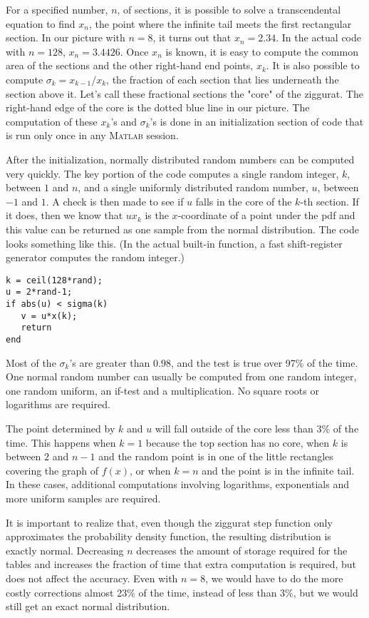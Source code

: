 \documentclass[a4paper,twocolumn,11pt]{article}
\newcommand{\Matlab}{{\textsc{Matlab}}}
\begin{document}
For a specified number, $n$, of sections, it is possible to solve a
transcendental equation to find $x_n$, the point where the infinite
tail meets the first rectangular section. In our picture with $n = 8$,
it turns out that $x_n = 2.34$. In the actual code with $n = 128$,
$x_n= 3.4426$. Once $x_n$ is known, it is easy to compute the common
area of the sections and the other right-hand end points, $x_k$. It is
also possible to compute $\sigma_k=x_{k-1}/x_{k}$, the fraction of
each section that lies underneath the section above it. Let's call
these fractional sections the "core" of the ziggurat. The right-hand
edge of the core is the dotted blue line in our picture. The
computation of these $x_k$'s and $\sigma_k$'s is done in an
initialization section of code that is run only once in any
{{\Matlab}} session.

After the initialization, normally distributed random numbers can be
computed very quickly. The key portion of the code computes a single
random integer, $k$, between $1$ and $n$, and a single uniformly
distributed random number, $u$, between $-1$ and $1$. A check is then
made to see if $u$ falls in the core of the $k$-th section. If it
does, then we know that $ux_k$ is the $x$-coordinate of a point under
the pdf and this value can be returned as one sample from the normal
distribution. The code looks something like this. (In the actual
built-in function, a fast shift-register generator computes the random
integer.)
\begin{verbatim}k = ceil(128*rand);
u = 2*rand-1;
if abs(u) < sigma(k)
   v = u*x(k);
   return
end
\end{verbatim}

Most of the $\sigma_k$'s are greater than $0.98$, and the test is true
over 97\% of the time. One normal random number can usually be
computed from one random integer, one random uniform, an if-test and a
multiplication. No square roots or logarithms are required.

The point determined by $k$ and $u$ will fall outside of the core less
than 3\% of the time. This happens when $k= 1$ because the top section
has no core, when $k$ is between $2$ and $n-1$ and the random point is
in one of the little rectangles covering the graph of $f(x)$, or when
$k = n$ and the point is in the infinite tail. In these cases,
additional computations involving logarithms, exponentials and more
uniform samples are required.

It is important to realize that, even though the ziggurat step
function only approximates the probability density function, the
resulting distribution is exactly normal. Decreasing $n$ decreases the
amount of storage required for the tables and increases the fraction
of time that extra computation is required, but does not affect the
accuracy. Even with $n = 8$, we would have to do the more costly
corrections almost 23\% of the time, instead of less than 3\%, but we
would still get an exact normal distribution.
\end{document}
